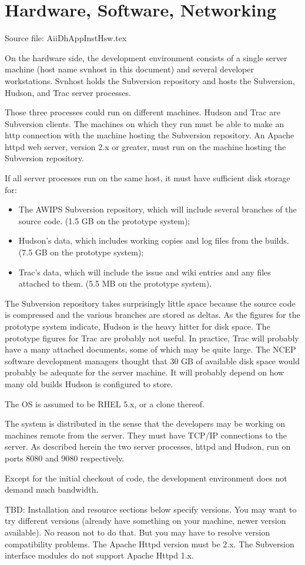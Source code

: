 

\section{Hardware, Software, Networking}

Source file: AiiDhAppInstHsw.tex

On the hardware side, the development environment consists of a single
server machine (host name svnhost in this document) and several developer
workstations.  Svnhost holds the Subversion repository and
hosts the Subversion, Hudson, and Trac server processes.

Those three processes could run on different machines.
Hudson and Trac are Subversion clients.  The machines on
which they run must be able to make an http connection with
the machine hosting the Subversion repository.  An Apache
httpd web server, version 2.x or greater, must run on the
machine hosting the Subversion repository.

If all server processes run on the same host, it must have sufficient disk
storage for: 
\begin{itemize}
\item
The AWIPS Subversion repository, which will include several
branches of the source code.  (1.5 GB on the prototype
system);
\item
Hudson's
data, which includes working copies and log files from the builds.
(7.5 GB on the prototype system);
\item
Trac's data, which will include the
issue and wiki entries and any files attached to them.  (5.5 MB on the
prototype system).
\end{itemize}

The Subversion repository takes surprisingly little space because the
source code is compressed and the various branches are stored as deltas.
As the figures for the prototype system indicate, Hudson is the heavy
hitter for disk space.  The prototype figures for Trac are probably not
useful.  In practice, Trac will probably have a many attached documents,
some of which may be quite large.  The NCEP software development managers
thought that 30 GB of available disk space would probably be adequate
for the server machine.  It will probably depend on how many old builds
Hudson is configured to store.

The OS is assumed to be RHEL 5.x, or a clone thereof.

The system is distributed in the sense that the developers may be working
on machines remote from the server.  They must have TCP/IP connections
to the server.  As described herein the two server processes, httpd and
Hudson, run on ports 8080 and 9080 respectively.

Except for the initial checkout of code, the development environment
does not demand much bandwidth.

TBD:  Installation and resource sections below specify versions.  You may
want to try different versions (already have something on your machine,
newer version available).  No reason not to do that.  But you may have
to resolve version compatibility problems.  The Apache Httpd version must
be 2.x.  The Subversion interface modules do not support Apache Httpd 1.x.

